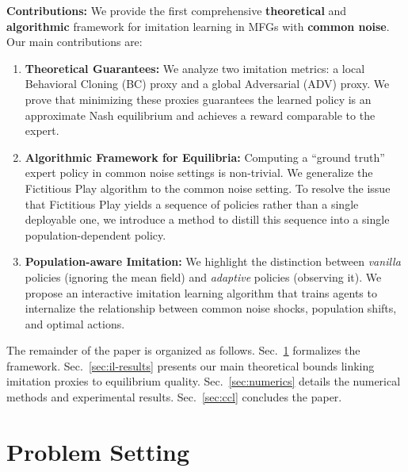 \documentclass{article}
\theoremstyle{plain}
\begin{document}
\noindent\textbf{Contributions:} 
We provide the first comprehensive \textbf{theoretical} and \textbf{algorithmic} framework for imitation learning in MFGs with \textbf{common noise}. 
Our main contributions are:
\begin{enumerate}%
    \item \textbf{Theoretical Guarantees:} We analyze two imitation metrics: a local Behavioral Cloning (BC) proxy and a global Adversarial (ADV) proxy. We prove that minimizing these proxies guarantees the learned policy is an approximate Nash equilibrium and achieves a reward comparable to the expert. %
    \item \textbf{Algorithmic Framework for Equilibria:} Computing a ``ground truth'' expert policy in common noise settings is non-trivial. We generalize the Fictitious Play algorithm to the common noise setting. To resolve the issue that Fictitious Play yields a sequence of policies rather than a single deployable one, we introduce a method to distill this sequence into a single population-dependent policy.
    \item \textbf{Population-aware Imitation:} We highlight the distinction between \textit{vanilla} policies (ignoring the mean field) and \textit{adaptive} policies (observing it). We propose an interactive imitation learning algorithm that trains agents to internalize the relationship between common noise shocks, population shifts, and optimal actions.
\end{enumerate}

The remainder of the paper is organized as follows. Sec.~\ref{sec:pb-setting} formalizes the framework. Sec.~\ref{sec:il-results} presents our main theoretical bounds linking imitation proxies to equilibrium quality. Sec.~\ref{sec:numerics} details the numerical methods and experimental results. Sec.~\ref{sec:ccl} concludes the paper.



\section{Problem Setting} 
\label{sec:pb-setting}
\end{document}
